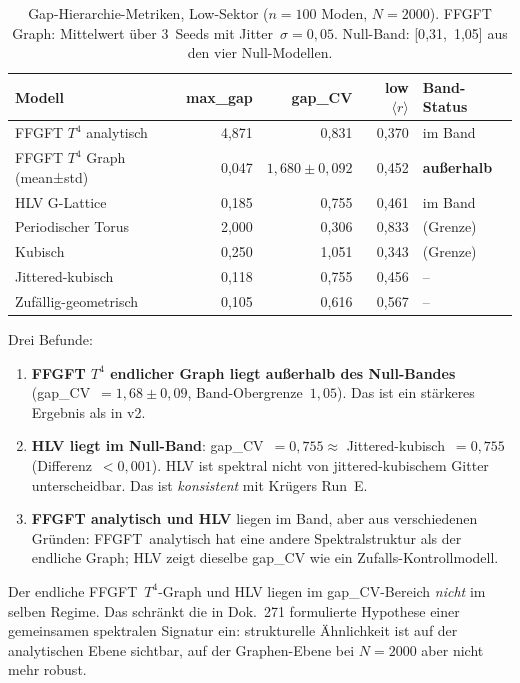 \begin{table}[ht]
\centering
\caption{Gap-Hierarchie-Metriken, Low-Sektor ($n=100$ Moden, $N=2000$).
FFGFT Graph: Mittelwert über 3~Seeds mit Jitter~$\sigma=0{,}05$.
Null-Band: \mbox{[0{,}31, 1{,}05]} aus den vier Null-Modellen.}
\label{tab:gap275v3}
\begin{tabular}{@{}lrrrl@{}}
\toprule
Modell & max\_gap & gap\_CV & low $\langle r\rangle$ & Band-Status \\
\midrule
FFGFT $T^4$ analytisch      & 4{,}871 & 0{,}831 & 0{,}370 & im Band \\
FFGFT $T^4$ Graph (mean±std)& 0{,}047 & $1{,}680\pm0{,}092$ & 0{,}452 & \textbf{außerhalb} \\
HLV G-Lattice               & 0{,}185 & 0{,}755 & 0{,}461 & im Band \\
\midrule
Periodischer Torus          & 2{,}000 & 0{,}306 & 0{,}833 & (Grenze) \\
Kubisch                     & 0{,}250 & 1{,}051 & 0{,}343 & (Grenze) \\
Jittered-kubisch            & 0{,}118 & 0{,}755 & 0{,}456 & -- \\
Zufällig-geometrisch        & 0{,}105 & 0{,}616 & 0{,}567 & -- \\
\bottomrule
\end{tabular}
\end{table}

Drei Befunde:

\begin{enumerate}
  \item \textbf{FFGFT $T^4$ endlicher Graph liegt außerhalb des Null-Bandes}
        (gap\_CV~$= 1{,}68 \pm 0{,}09$, Band-Obergrenze~$1{,}05$).
        Das ist ein stärkeres Ergebnis als in v2.

  \item \textbf{HLV liegt im Null-Band}: gap\_CV~$= 0{,}755 \approx$
        Jittered-kubisch~$= 0{,}755$ (Differenz~$< 0{,}001$).
        HLV ist spektral nicht von jittered-kubischem Gitter unterscheidbar.
        Das ist \emph{konsistent} mit Krügers Run~E.

  \item \textbf{FFGFT analytisch und HLV} liegen im Band, aber aus
        verschiedenen Gründen: FFGFT~analytisch hat eine andere Spektralstruktur
        als der endliche Graph; HLV zeigt dieselbe gap\_CV wie ein
        Zufalls-Kontrollmodell.
\end{enumerate}

\begin{remark}
Der endliche FFGFT~$T^4$-Graph und HLV liegen im gap\_CV-Bereich
\emph{nicht} im selben Regime. Das schränkt die in Dok.~271 formulierte
Hypothese einer gemeinsamen spektralen Signatur ein: strukturelle
Ähnlichkeit ist auf der analytischen Ebene sichtbar, auf der
Graphen-Ebene bei $N=2000$ aber nicht mehr robust.
\end{remark}

